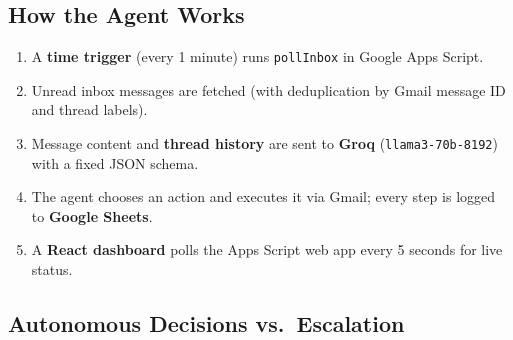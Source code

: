 \documentclass[11pt,a4paper]{article}
\begin{document}
\subsection*{How the Agent Works}

\begin{enumerate}[nosep]
  \item A \textbf{time trigger} (every 1 minute) runs \texttt{pollInbox} in Google Apps Script.
  \item Unread inbox messages are fetched (with deduplication by Gmail message ID and thread labels).
  \item Message content and \textbf{thread history} are sent to \textbf{Groq} (\texttt{llama3-70b-8192}) with a fixed JSON schema.
  \item The agent chooses an action and executes it via Gmail; every step is logged to \textbf{Google Sheets}.
  \item A \textbf{React dashboard} polls the Apps Script web app every 5 seconds for live status.
\end{enumerate}

\subsection*{Autonomous Decisions vs.\ Escalation}
\end{document}
